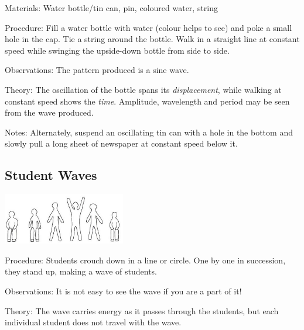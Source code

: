 \begin{multicols}{2}
\begin{description*}
\item[Materials:]{Water bottle/tin can, pin, coloured water, string}
\item[Procedure:]{Fill a water bottle with water (colour helps to see) and poke a small hole in the cap. Tie a string around the bottle. Walk in a straight line at constant speed while swinging the upside-down bottle from side to side.}
\item[Observations:]{The pattern produced is a sine wave.}
\item[Theory:]{The oscillation of the bottle spans its \emph{displacement}, while walking at constant speed shows the \emph{time}. Amplitude, wavelength and period may be seen from the wave produced.}
\item[Notes:]{Alternately, suspend an oscillating tin can with a hole in the bottom and slowly pull a long sheet of newspaper at constant speed below it.}
\end{description*}

\subsection{Student Waves}

\begin{center}
\includegraphics[width=0.4\textwidth]{./img/vso/student-waves.png}
\end{center}

\begin{description*}
\item[Procedure:]{Students crouch down in a line or circle. One by one in succession, they stand up, making a wave of students.}
\item[Observations:]{It is not easy to see the wave if you are a part of it!}
\item[Theory:]{The wave carries energy as it passes through the students, but each individual student does not travel with the wave.}
\end{description*}


\end{multicols}
